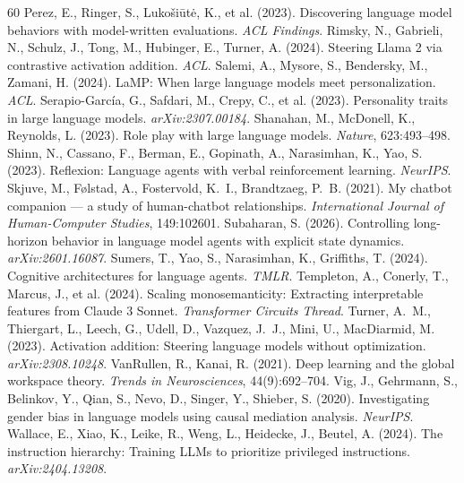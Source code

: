 \documentclass[11pt]{article}
\begin{document}
\begin{thebibliography}{60}
 Perez, E., Ringer, S., Luko\v{s}i\=ut\.e, K., et al. (2023). Discovering language model behaviors with model-written evaluations. \emph{ACL Findings}.
 Rimsky, N., Gabrieli, N., Schulz, J., Tong, M., Hubinger, E., Turner, A. (2024). Steering Llama 2 via contrastive activation addition. \emph{ACL}.
 Salemi, A., Mysore, S., Bendersky, M., Zamani, H. (2024). LaMP: When large language models meet personalization. \emph{ACL}.
 Serapio-Garc\'ia, G., Safdari, M., Crepy, C., et al. (2023). Personality traits in large language models. \emph{arXiv:2307.00184}.
 Shanahan, M., McDonell, K., Reynolds, L. (2023). Role play with large language models. \emph{Nature}, 623:493--498.
 Shinn, N., Cassano, F., Berman, E., Gopinath, A., Narasimhan, K., Yao, S. (2023). Reflexion: Language agents with verbal reinforcement learning. \emph{NeurIPS}.
 Skjuve, M., F\o lstad, A., Fostervold, K.~I., Brandtzaeg, P.~B. (2021). My chatbot companion --- a study of human-chatbot relationships. \emph{International Journal of Human-Computer Studies}, 149:102601.
 Subaharan, S. (2026). Controlling long-horizon behavior in language model agents with explicit state dynamics. \emph{arXiv:2601.16087}.
 Sumers, T., Yao, S., Narasimhan, K., Griffiths, T. (2024). Cognitive architectures for language agents. \emph{TMLR}.
 Templeton, A., Conerly, T., Marcus, J., et al. (2024). Scaling monosemanticity: Extracting interpretable features from Claude 3 Sonnet. \emph{Transformer Circuits Thread}.
 Turner, A.~M., Thiergart, L., Leech, G., Udell, D., Vazquez, J.~J., Mini, U., MacDiarmid, M. (2023). Activation addition: Steering language models without optimization. \emph{arXiv:2308.10248}.
 VanRullen, R., Kanai, R. (2021). Deep learning and the global workspace theory. \emph{Trends in Neurosciences}, 44(9):692--704.
 Vig, J., Gehrmann, S., Belinkov, Y., Qian, S., Nevo, D., Singer, Y., Shieber, S. (2020). Investigating gender bias in language models using causal mediation analysis. \emph{NeurIPS}.
 Wallace, E., Xiao, K., Leike, R., Weng, L., Heidecke, J., Beutel, A. (2024). The instruction hierarchy: Training LLMs to prioritize privileged instructions. \emph{arXiv:2404.13208}.

\end{thebibliography}
\end{document}
